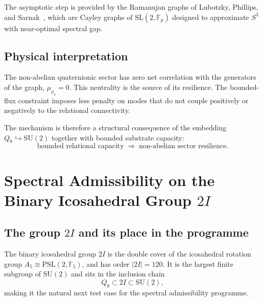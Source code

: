 \documentclass[11pt,a4paper]{article}
\begin{document}
    The asymptotic step is provided by the Ramanujan graphs of
    Lubotzky, Phillips, and Sarnak~\cite{LPS1988}, which are Cayley graphs of
    $\mathrm{SL}(2,\mathbb{F}_p)$ designed to approximate $S^3$ with near-optimal
    spectral gap.

  \subsection{Physical interpretation}
    \label{sec:step4-physics}

    The non-abelian quaternionic sector has zero net correlation with the
    generators of the graph, $\mu_{\rho_4} = 0$.
    This neutrality is the source of its resilience.
    The bounded-flux constraint imposes less penalty on modes that do not couple
    positively or negatively to the relational connectivity.

    The mechanism is therefore a structural consequence of the embedding
    $Q_8 \hookrightarrow \mathrm{SU}(2)$ together with bounded substrate capacity:
    \begin{equation}
      \text{bounded relational capacity}
      \;\Longrightarrow\;
      \text{non-abelian sector resilience}.
    \end{equation}
\section{Spectral Admissibility on the Binary Icosahedral Group $2I$}
  \label{sec:step5}

  \subsection{The group $2I$ and its place in the programme}
    \label{sec:step5-intro}

    The binary icosahedral group $2I$ is the double cover of the icosahedral
    rotation group $A_5 \cong \mathrm{PSL}(2,\mathbb{F}_5)$, and has order
    $|2I| = 120$.
    It is the largest finite subgroup of $\mathrm{SU}(2)$ and sits in the
    inclusion chain
    \begin{equation}
      Q_8 \subset 2I \subset \mathrm{SU}(2),
      \label{eq:chain}
    \end{equation}
    making it the natural next test case for the spectral admissibility
    programme.
\end{document}
